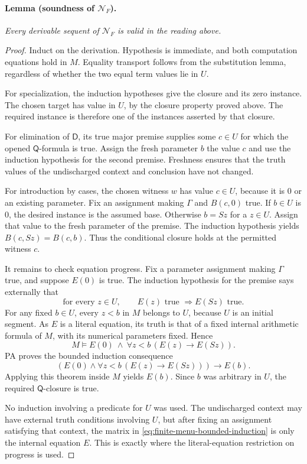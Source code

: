 \paragraph{Lemma (soundness of $\mathcal N_F$).}
\emph{Every derivable sequent of $\mathcal N_F$ is valid in the reading
above.}

\begin{proof}
Induct on the derivation.  Hypothesis is immediate, and both computation
equations hold in $M$.  Equality transport follows from the substitution
lemma, regardless of whether the two equal term values lie in $U$.

For specialization, the induction hypotheses give the closure and its
zero instance.  The chosen target has value in $U$, by the closure property
proved above.  The required instance is therefore one of the instances
asserted by that closure.

For elimination of $\mathsf D$, its true major premise supplies some
$c\in U$ for which the opened $\mathsf Q$-formula is true.  Assign the fresh
parameter $b$ the value $c$ and use the induction hypothesis for the second
premise.  Freshness ensures that the truth values of the undischarged
context and conclusion have not changed.

For introduction by cases, the chosen witness $w$ has value $c\in U$,
because it is $0$ or an existing parameter.  Fix an assignment making
$\Gamma$ and $B(c,0)$ true.  If $b\in U$ is $0$, the desired instance is
the assumed base.  Otherwise $b=Sz$ for a $z\in U$.  Assign that value to
the fresh parameter of the premise.  The induction hypothesis yields
$B(c,Sz)=B(c,b)$.  Thus the conditional closure holds at the permitted
witness $c$.

It remains to check equation progress.  Fix a parameter assignment making
$\Gamma$ true, and suppose $E(0)$ is true.  The induction hypothesis for
the premise says externally that
\[
 \text{for every }z\in U,\qquad E(z)\text{ true }\Longrightarrow E(Sz)
 \text{ true}.
\]
For any fixed $b\in U$, every $z<b$ in $M$ belongs to $U$, because $U$ is
an initial segment.  As $E$ is a literal equation, its truth is that of a
fixed internal arithmetic formula of $M$, with its numerical parameters
fixed.  Hence
\[
 M\models E(0)\ \wedge\ \forall z<b\,(E(z)\longrightarrow E(Sz)).
\]
PA proves the bounded induction consequence
\begin{equation}
 \left(E(0)\wedge\forall z<b\,(E(z)\longrightarrow E(Sz))\right)
       \longrightarrow E(b).
 \label{eq:finite-menu-bounded-induction}
\end{equation}
Applying this theorem inside $M$ yields $E(b)$.  Since $b$ was arbitrary
in $U$, the required $\mathsf Q$-closure is true.

No induction involving a predicate for $U$ was used.  The undischarged
context may have external truth conditions involving $U$, but after fixing
an assignment satisfying that context, the matrix in
\eqref{eq:finite-menu-bounded-induction} is only the internal equation
$E$.  This is exactly where the literal-equation restriction on progress
is used.
\end{proof}

